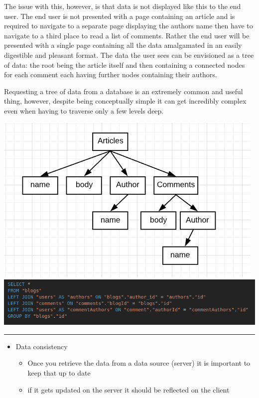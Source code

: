 \documentclass[
  12pt,
]{article}
\providecommand{\tightlist}{%
  \setlength{\itemsep}{0pt}\setlength{\parskip}{0pt}}
\begin{document}
The issue with this, however, is that data is not displayed like this to
the end user. The end user is not presented with a page containing an
article and is required to navigate to a separate page displaying the
authors name then have to navigate to a third place to read a list of
comments. Rather the end user will be presented with a single page
containing all the data amalgamated in an easily digestible and pleasant
format. The data the user sees can be envisioned as a tree of data: the
root being the article itself and then containing a connected nodes for
each comment each having further nodes containing their authors.

Requesting a tree of data from a database is an extremely common and
useful thing, however, despite being conceptually simple it can get
incredibly complex even when having to traverse only a few levels deep.

\includegraphics{./images/tree-diagram.png}
\includegraphics{./images/tree-with-joins.png}

\begin{center}\rule{0.5\linewidth}{\linethickness}\end{center}

\begin{itemize}
\tightlist
\item
  Data consistency

  \begin{itemize}
  \tightlist
  \item
    Once you retrieve the data from a data source (server) it is
    important to keep that up to date
  \item
    if it gets updated on the server it should be reflected on the
    client
  \end{itemize}
\end{itemize}
\end{document}
